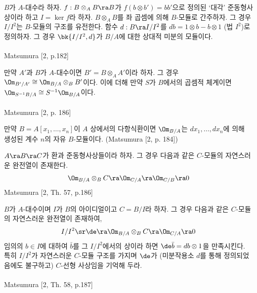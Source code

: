 	
	\begin{propositiona}
	$B$가 $A$-대수라 하자. $f:B\otimes_AB\ra B$가 $f(b\otimes b')=bb'$으로 정의된 `대각' 준동형사상이라 하고 $I=\ker f$라 하자.
	$B\otimes_AB$를 좌 곱셈에 의해 $B$-모듈로 간주하자. 그 경우 $I/I^2$는 $B$-모듈의 구조를 유전한다.
	함수 $d:B\ra I/I^2$를 $db=1\otimes b-b\otimes 1$ (법 $I^2$)로 정의하자.
	그 경우 $\bk{I/I^2,d}$가 $B/A$에 대한 상대적 미분의 모듈이다.\\\\
	\pf Matsumura [2, p.182]
	\end{propositiona}
	
	
	\begin{propositiona}
	만약 $A'$과 $B$가 $A$-대수이면 $B'=B\otimes_AA'$이라 하자.
	그 경우 $\Om_{B'/A'}\cong\Om_{B/A}\otimes_BB'$이다.
	이에 더해 만약 $S$가 $B$에서의 곱셈적 체계이면 $\Om_{S^{-1}B/A}\cong S^{-1}\Om_{B/A}$이다.\\\\
	\pf Matsumura [2, p. 186]
	\end{propositiona}
	
	
	\begin{example}
	만약 $B=A[x_1,\ldots,x_n]$이 $A$ 상에서의 다항식환이면 $\Om_{B/A}$는 $dx_1,\ldots,dx_n$에 의해 생성된 계수 $n$의 자유 $B$-모듈이다.
	(Matsumura [2, p. 184])
	\end{example}
	
	
	\begin{propositiona}
	$A\ra B\ra C$가 환과 준동형사상들이라 하자. 그 경우 다음과 같은 $C$-모듈의 자연스러운 완전열이 존재한다.
	$$\Om_{B/A}\otimes_BC\ra\Om_{C/A}\ra\Om_{C/B}\ra 0$$
	\pf Matsumura [2, Th. 57, p.186]
	\end{propositiona}
	
	
	\begin{propositiona}
	$B$가 $A$-대수이며 $I$가 $B$의 아이디얼이고 $C=B/I$라 하자. 그 경우 다음과 같은 $C$-모듈의 자연스러운 완전열이 존재하여,
	$$I/I^2\sr\de\ra\Om_{B/A}\otimes_BC\ra\Om_{C/A}\ra 0$$
	임의의 $b\in I$에 대하여 $\bar b$를 그 $I/I^2$에서의 상이라 하면 $\de\bar b=db\otimes 1$을 만족시킨다.
	특히 $I/I^2$가 자연스러운 $C$-모듈 구조를 가지며
	$\de$가 (미분작용소 $d$를 통해 정의되었음에도 불구하고) $C$-선형 사상임을 기억해 두라.\\\\
	\pf Matsumura [2, Th. 58, p.187]
	\end{propositiona}
	
